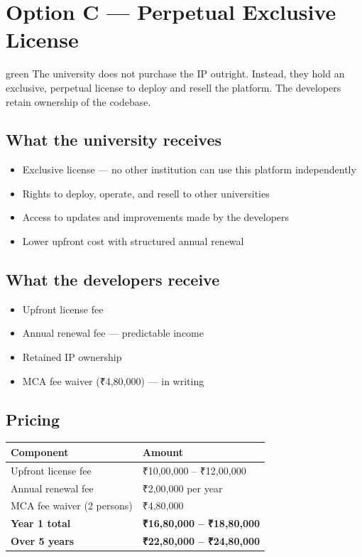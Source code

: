 \documentclass[12pt,a4paper]{article}
\begin{document}
\newpage
\section{Option C — Perpetual Exclusive License}

\begin{scenariobox}{green}
The university does not purchase the IP outright. Instead, they hold an exclusive, perpetual license to deploy and resell the platform. The developers retain ownership of the codebase.
\end{scenariobox}

\vspace{0.4cm}

\subsection*{What the university receives}
\begin{itemize}[leftmargin=*, noitemsep]
    \item Exclusive license — no other institution can use this platform independently
    \item Rights to deploy, operate, and resell to other universities
    \item Access to updates and improvements made by the developers
    \item Lower upfront cost with structured annual renewal
\end{itemize}

\subsection*{What the developers receive}
\begin{itemize}[leftmargin=*, noitemsep]
    \item Upfront license fee
    \item Annual renewal fee — predictable income
    \item Retained IP ownership
    \item MCA fee waiver (₹4,80,000) — in writing
\end{itemize}

\subsection*{Pricing}

\begin{tabularx}{\textwidth}{L{5cm} X}
\toprule
{}
\textbf{Component} & \textbf{Amount} \\
\midrule
Upfront license fee & ₹10,00,000 – ₹12,00,000 \\
Annual renewal fee & ₹2,00,000 per year \\
MCA fee waiver (2 persons) & ₹4,80,000 \\
\textbf{Year 1 total} & \textbf{₹16,80,000 – ₹18,80,000} \\
\textbf{Over 5 years} & \textbf{₹22,80,000 – ₹24,80,000} \\
\bottomrule
\end{tabularx}
\end{document}
